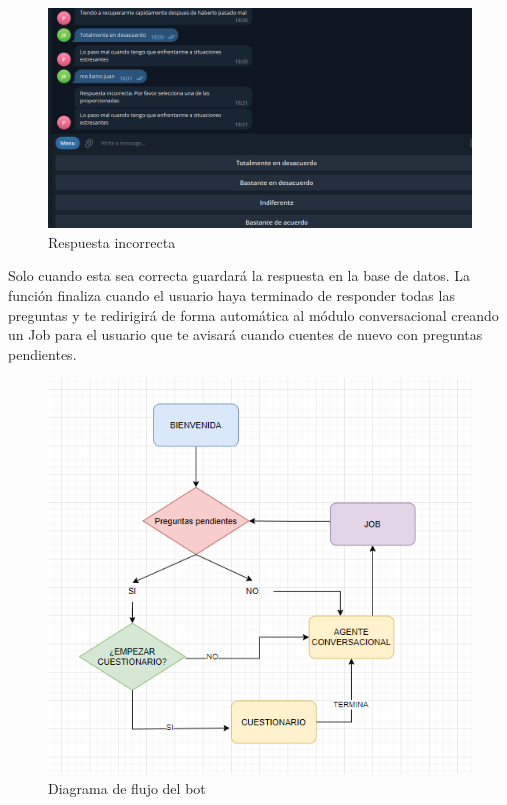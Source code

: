 \begin{figure}[!ht]
    \centering
    \includegraphics[width=1\textwidth]{imagenes/pregunta_incorrecta.png}
    \caption{ Respuesta incorrecta }
    \label{fig:wrong}
\end{figure}\vspace{0.3cm}

Solo cuando esta sea correcta guardará la respuesta en la base de datos. La función finaliza cuando el usuario haya terminado de responder todas las preguntas y te redirigirá de forma automática al módulo conversacional creando un Job para el usuario que te avisará cuando cuentes de nuevo con preguntas pendientes. \vspace{0.5cm}

\begin{figure}[!ht]
    \centering
    \includegraphics[width=1\textwidth]{imagenes/flujo.png}
    \caption{ Diagrama de flujo del bot}
    \label{fig:flujo}
\end{figure}

